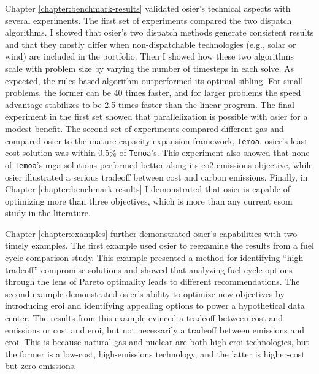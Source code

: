 Chapter \ref{chapter:benchmark-results} validated \ac{osier}'s technical aspects
with several experiments. The first set of experiments compared the two dispatch
algorithms. I showed that \ac{osier}'s two dispatch methods generate consistent
results and that they mostly differ when non-dispatchable technologies (e.g.,
solar or wind) are included in the portfolio. Then I showed how these two
algorithms scale with problem size by varying the number of timesteps in each
solve. As expected, the rules-based algorithm outperformed its optimal sibling.
For small problems, the former can be 40 times faster, and for larger problems
the speed advantage stabilizes to be 2.5 times faster than the linear program.
The final experiment in the first set showed that parallelization is possible
with \ac{osier} for a modest benefit. The second set of experiments compared
different \acp{ga} and compared \ac{osier} to the mature capacity expansion
framework, \texttt{Temoa}. \ac{osier}'s least cost solution was within 0.5\% of
\texttt{Temoa}'s. This experiment also showed that none of \texttt{Temoa}'s
\ac{mga} solutions performed better along its \ac{co2} emissions objective,
while \ac{osier} illustrated a serious tradeoff between cost and carbon
emissions. Finally, in Chapter \ref{chapter:benchmark-results} I demonstrated
that \ac{osier} is capable of optimizing more than three objectives, which is
more than any current \ac{esom} study in the literature.

Chapter \ref{chapter:examples} further demonstrated \ac{osier}'s capabilities
with two timely examples. The first example used \ac{osier} to reexamine the
results from a fuel cycle comparison study. This example presented a method for
identifying ``high tradeoff'' compromise solutions and showed that analyzing
fuel cycle options through the lens of Pareto optimality leads to different
recommendations. The second example demonstrated \ac{osier}'s ability to
optimize new objectives by introducing \acf{eroi} and identifying appealing
options to power a hypothetical data center. The results from this example
evinced a tradeoff between cost and emissions or cost and \ac{eroi}, but not
necessarily a tradeoff between emissions and \ac{eroi}. This is because natural
gas and nuclear are both high \ac{eroi} technologies, but the former is a
low-cost, high-emissions technology, and the latter is higher-cost but
zero-emissions.

